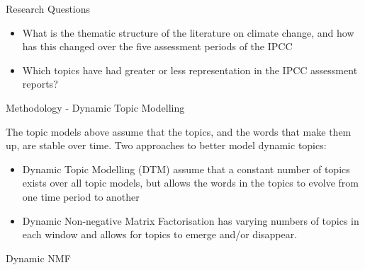 \documentclass[9pt]{beamer}
\begin{document}

\begin{frame}{Research Questions}
\begin{itemize}
	\item What is the thematic structure of the literature on climate change, and how has this changed over the five assessment periods of the IPCC
	\item Which topics have had greater or less representation in the IPCC assessment reports?
\end{itemize}
\end{frame}


\begin{frame}{Methodology - Dynamic Topic Modelling}

The topic models above assume that the topics, and the words that make them up, are stable over time. Two approaches to better model dynamic topics:

\begin{itemize}
	\item<2->Dynamic Topic Modelling (DTM) \citep{Blei2006} assume that a constant number of topics exists over all topic models, but allows the words in the topics to evolve from one time period to another
	\item<3->Dynamic Non-negative Matrix Factorisation \citep{Greene2016} has varying numbers of topics in each window and allows for topics to emerge and/or disappear.
\end{itemize}


\end{frame}



\begin{frame}[t]{Dynamic NMF}



\end{frame}
\end{document}
